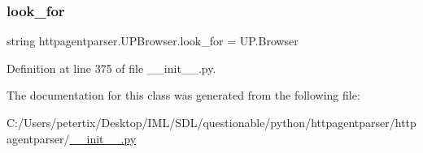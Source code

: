 \subsubsection{\texorpdfstring{look\+\_\+for}{look\_for}}
{\footnotesize\ttfamily string httpagentparser.\+U\+P\+Browser.\+look\+\_\+for = \textquotesingle{}U\+P.\+Browser\textquotesingle{}\hspace{0.3cm}{\ttfamily [static]}}



Definition at line 375 of file \+\_\+\+\_\+init\+\_\+\+\_\+.\+py.



The documentation for this class was generated from the following file\+:\begin{DoxyCompactItemize}
\item 
C\+:/\+Users/petertix/\+Desktop/\+I\+M\+L/\+S\+D\+L/questionable/python/httpagentparser/httpagentparser/\hyperlink{____init_____8py}{\+\_\+\+\_\+init\+\_\+\+\_\+.\+py}\end{DoxyCompactItemize}
